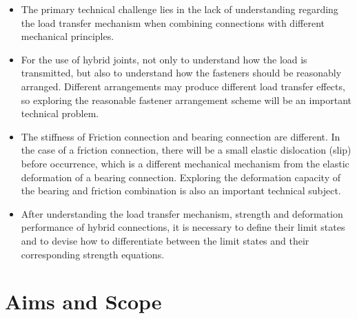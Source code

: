 \begin{itemize}
    \item The primary technical challenge lies in the lack of understanding regarding the load transfer mechanism when combining connections with different mechanical principles.
    \item For the use of hybrid joints, not only to understand how the load is transmitted, but also to understand how the fasteners should be reasonably arranged. Different arrangements may produce different load transfer effects, so exploring the reasonable fastener arrangement scheme will be an important technical problem.
    \item The stiffness of Friction connection and bearing connection are different. In the case of a friction connection, there will be a small elastic dislocation (slip) before occurrence, which is a different mechanical mechanism from the elastic deformation of a bearing connection. Exploring the deformation capacity of the bearing and friction combination is also an important technical subject.
    \item After understanding the load transfer mechanism, strength and deformation performance of hybrid connections, it is necessary to define their limit states and to devise how to differentiate between the limit states and their corresponding strength equations.
    
\end{itemize}



\section{Aims and Scope}

